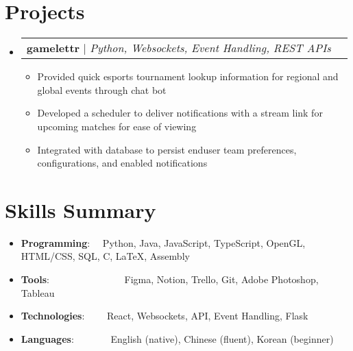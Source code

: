 \documentclass[letter,11pt]{extarticle}
\makeatletter
\newcommand{\resumeSkillItem}[2]{
	\item\small{
		\textbf{#1}{: #2 \vspace{-2pt}}
	}
}
\newcommand{\resumeItem}[1]{
	\item\small{
		#1 \vspace{-1pt}
	}
}
\newcommand{\resumeProjectHeading}[3]{
	\vspace{-3pt}\item
		\begin{tabular*}{1\linewidth}{l@{\extracolsep{\fill}}r}
			\textbf{#1} $|$ \emph{#2} & #3 \\
		\end{tabular*}\vspace{-3pt}
}
\newcommand{\resumeSubItem}[2]{\resumeSkillItem{#1}{#2}\vspace{-5pt}}
\newcommand{\resumeSubHeadingListStart}{\begin{itemize}[leftmargin=0.15in,label={}]}
\newcommand{\resumeSubHeadingListEnd}{\end{itemize}}
\newcommand{\resumeItemListStart}{\begin{itemize}\vspace{-3pt}}
\newcommand{\resumeItemListEnd}{\end{itemize}\vspace{-3pt}}
\makeatother
\begin{document}
\section{Projects}
    \resumeSubHeadingListStart
    \vspace{1mm}
        \resumeProjectHeading
            {gamelettr}
            {Python, Websockets, Event Handling, REST APIs}
            {}
            \resumeItemListStart
                \resumeItem{Provided quick esports tournament lookup information for
                    regional and global events through chat bot}
                \resumeItem{Developed a scheduler to deliver notifications with
                    a stream link for upcoming matches for ease of viewing}
                \resumeItem{Integrated with database to persist enduser team preferences, 
                    configurations, and enabled notifications}
            \resumeItemListEnd

    \resumeSubHeadingListEnd

\section{Skills Summary}
	\resumeSubHeadingListStart
		\resumeSubItem{Programming}
			{\hspace{0.6mm}~~Python, Java, JavaScript, TypeScript, OpenGL, HTML/CSS, SQL, C, \LaTeX, Assembly}
		\resumeSubItem{Tools}
            {\hspace{0.3mm}~~~~~~~~~~~~~~~Figma, Notion, Trello, Git, Adobe
                Photoshop, Tableau}
		\resumeSubItem{Technologies}
			{~~~~React, Websockets, API, Event Handling, Flask}
        \resumeSubItem{Languages}
			{\hspace{0.6mm}~~~~~~~English (native), Chinese (fluent), Korean (beginner)}
	\resumeSubHeadingListEnd
\end{document}
